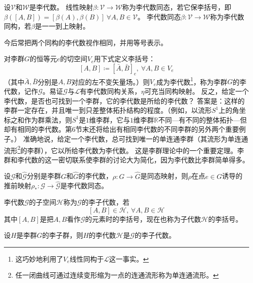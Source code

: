 \begin{definition}
    设$\mathscr{V}$和$\mathscr{W}$是李代数。
    线性映射$\beta \colon \mathscr{V} \to \mathscr{W}$称为李代数同态，若它保李括号，即$\beta([A, B]) = [\beta(A), \beta(B)] ~ \forall A, B \in \mathscr{V}$。
    李代数同态$\beta \colon \mathscr{V} \to \mathscr{W}$称为李代数同构，若$\beta$是一一到上映射。
\end{definition}

\begin{note}
    今后常把两个同构的李代数视作相同，并用等号表示。
\end{note}

对李群$G$的恒等元$e$的切空间$V_e$用下式定义李括号：
$$[A, B] \coloneq [\bar A, \bar B]_e, ~ \forall A, B \in V_e$$
（其中$\bar A, \bar B$分别是$A, B$对应的左不变矢量场。）则$V_e$成为李代数\footnote{
    这巧妙地利用了$V_e$线性同构于$\mathscr{L}$这一事实。
}，称为李群$G$的李代数，记作$\mathscr{G}$。易证$\mathscr{G}$与$\mathscr{L}$有李代数同构关系，$\eta$可充当同构映射。
反之，给定一个李代数，是否也可找到一个李群，它的李代数是所给的李代数？
答案是：这样的李群一定存在，并且唯一到只差整体拓扑结构的程度。（例如，以流形$S^1$上的角坐标之和作为群乘法，则$S^1$是$1$维李群，它与$1$维李群$\mathbb{R}$不同---有不同的整体拓扑---但却有相同的李代数。第$6$节末还将给出有相同李代数的不同李群的另外两个重要例子。）
准确地说，给定一个李代数，总可找到唯一的单连通李群（其流形为单连通流形\footnote{
    任一闭曲线可通过连续变形缩为一点的连通流形称为单连通流形。
}的李群），它以所给李代数为李代数。
这是李群理论中的一个重要定理。李群和李代数的这一密切联系使李群的讨论大为简化，因为李代数比李群简单得多。

\begin{theorem}
    设$\mathscr{G}$和$\mathscr{\hat G}$分别是李群$G$和$\hat G$的李代数，$\rho \colon G \to \hat G$是同态映射，则$\rho$在点$e \in G$诱导的推前映射$\rho_* \colon \mathscr{G} \to \mathscr{\hat G}$是李代数同态。
\end{theorem}

\begin{definition}
    李代数$\mathscr{G}$的子空间$\mathscr{H}$称为$\mathscr{G}$的李子代数，若
    $$[A, B] \in \mathscr{H}, ~ \forall A, B \in \mathscr{H}$$
    其中$[A, B]$是把$A, B$看作$\mathscr{G}$的元素时的李括号，现在也称为子代数$\mathscr{H}$的李括号。
\end{definition}

\begin{theorem}
    设$H$是李群$G$的李子群，则$H$的李代数$\mathscr{H}$是$\mathscr{G}$的李子代数。
\end{theorem}

